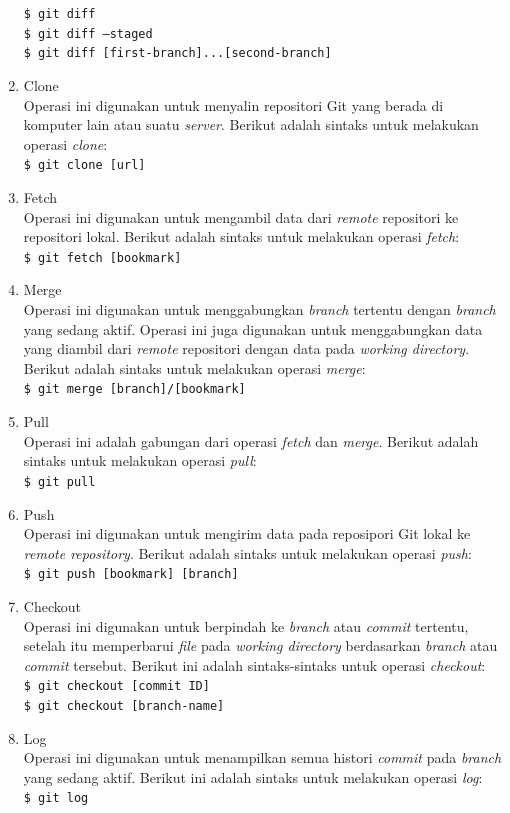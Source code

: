 \begin{enumerate}
\texttt{\$ git diff} \\
\texttt{\$ git diff --staged}\\
\texttt{\$ git diff [first-branch]...[second-branch]}
\item Clone\\
Operasi ini digunakan untuk menyalin repositori Git yang berada di komputer lain atau suatu \textit{server}. Berikut adalah sintaks untuk melakukan operasi \textit{clone}:\\
\texttt{\$ git clone [url]}
\item Fetch\\
Operasi ini digunakan untuk mengambil data dari \textit{remote} repositori ke repositori lokal. Berikut adalah sintaks untuk melakukan operasi \textit{fetch}:\\
\texttt{\$ git fetch [bookmark]}
\item Merge\\
Operasi ini digunakan untuk menggabungkan \textit{branch} tertentu dengan \textit{branch} yang sedang aktif. Operasi ini juga digunakan untuk menggabungkan data yang diambil dari \textit{remote} repositori dengan data pada \textit{working directory}. Berikut adalah sintaks untuk melakukan operasi \textit{merge}:\\
\texttt{\$ git merge [branch]/[bookmark]}
\item Pull\\
Operasi ini adalah gabungan dari operasi \textit{fetch} dan \textit{merge}. Berikut adalah sintaks untuk melakukan operasi \textit{pull}:\\
\texttt{\$ git pull }
\item Push\\
Operasi ini digunakan untuk mengirim data pada reposipori Git lokal ke \textit{remote repository}.
Berikut adalah sintaks untuk melakukan operasi \textit{push}:\\
\texttt{\$ git push [bookmark] [branch]}
\item Checkout\\
Operasi ini digunakan untuk berpindah ke \textit{branch} atau \textit{commit} tertentu, setelah itu memperbarui \textit{file} pada \textit{working directory} berdasarkan \textit{branch} atau \textit{commit} tersebut. Berikut ini adalah sintaks-sintaks untuk operasi \textit{checkout}:\\
\texttt{\$ git checkout [commit ID]}\\
\texttt{\$ git checkout [branch-name]}
\item Log\\
Operasi ini digunakan untuk menampilkan semua histori \textit{commit} pada \textit{branch} yang sedang aktif. Berikut ini adalah sintaks untuk melakukan operasi \textit{log}:\\
\texttt{\$ git log}


\end{enumerate}
